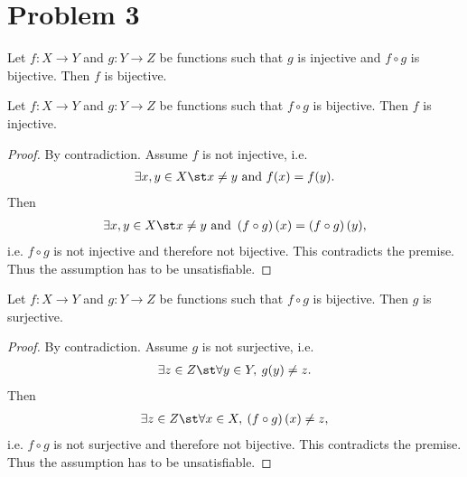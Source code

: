 \documentclass{article}
\begin{document}
\section*{Problem 3}
\begin{claim}
  Let $f:X\to Y$ and $g:Y\to Z$ be functions such that $g$ is injective and $f\circ g$ is bijective. Then $f$ is bijective.
\end{claim}
\begin{adjustwidth}{2em}{0pt}
  \begin{lemma}
    \label{l1}
    Let $f:X\to Y$ and $g:Y\to Z$ be functions such that $f\circ g$ is bijective. Then $f$ is injective.
  \end{lemma}
  \begin{proof}
    By contradiction. Assume $f$ is not injective, i.e. 
    \begin{align*}
      \exists x,y \in X \st x \not= y \text{ and } f(x) = f(y).
    \end{align*}
    Then
    \begin{align*}
      \exists x,y \in X \st x \not= y \text{ and } \left(f\circ g\right)(x) = \left(f\circ g\right)(y),
    \end{align*}
    i.e. $f\circ g$ is not injective and therefore not bijective.
    This contradicts the premise.
    Thus the assumption has to be unsatisfiable.
  \end{proof}
  \begin{lemma}
    \label{l2}
    Let $f:X\to Y$ and $g:Y\to Z$ be functions such that $f\circ g$ is bijective. Then $g$ is surjective.
  \end{lemma}
  \begin{proof}
    By contradiction. Assume $g$ is not surjective, i.e.
    \begin{align*}
      \exists z \in Z \st \forall y \in Y,\:g(y) \not= z.
    \end{align*}
    Then
    \begin{align*}
      \exists z \in Z \st \forall x \in X,\: \left(f\circ g\right)(x) \not= z,
    \end{align*}
    i.e. $f\circ g$ is not surjective and therefore not bijective.
    This contradicts the premise.
    Thus the assumption has to be unsatisfiable.
  \end{proof}
\end{adjustwidth}
\end{document}
